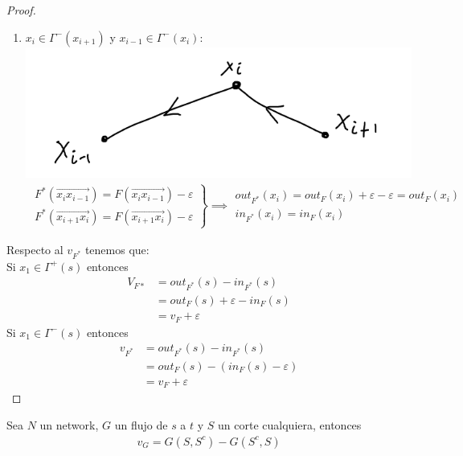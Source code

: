 \begin{proof}
\begin{enumerate}
\item $x_{i}\in \Gamma^-(x_{i+1})$ y $x_{i-1} \in \Gamma^-(x_{i})$: \includegraphics[scale=0.4]{img/backward-backward.png}
\begin{align}
    \left.
    \begin{array}{cc}
    F^*(\overrightarrow{x_i x_{i-1}}) = F(\overrightarrow{x_{i} x_{i-1}}) - \varepsilon\\
    F^*(\overrightarrow{x_{i+1} x_{i}}) = F(\overrightarrow{x_{i+1} x_{i}}) - \varepsilon 
    \end{array}
     \right\} \implies
     \begin{array}{cc}
    out_{F^*}(x_i) = out_F(x_i) + \varepsilon -  \varepsilon = out_F(x_i)\\
    in_{F^*} (x_i) = in_F(x_i)
    \end{array}
\end{align}

\end{enumerate}

Respecto al $v_{F^*}$ tenemos que:\\
Si $x_1 \in \Gamma^+(s)$ entonces
\begin{align}
    V_{F*} &= out_{F^*}(s) - in_{F^*}(s)\\
        &= out_F(s) + \varepsilon - in_{F}(s)\\
        &= v_F + \varepsilon
\end{align}
Si $x_1 \in \Gamma^-(s)$ entonces
\begin{align}
    v_{F^*} &= out_{F^{*}}(s) - in_{F^*}(s)\\
        &= out_F(s) - (in_F(s) - \varepsilon)\\
        &= v_F + \varepsilon
\end{align}
\end{proof}

\begin{lemma}
Sea $N$ un network, $G$ un flujo de $s$ a $t$ y $S$ un corte cualquiera, entonces
\begin{align}
    v_G = G(S, S^c) - G(S^c, S)
\end{align}
\end{lemma}

